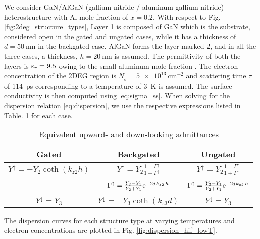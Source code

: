 We consider GaN/AlGaN (gallium nitride / aluminum gallium nitride)  heterostructure with Al mole-fraction of $x = \num[round-precision=1]{0.2}$. With respect to Fig. \ref{fig:2deg_structure_types}, Layer 1 is composed of GaN which is the substrate, considered open in the gated and ungated cases, while it has a thickness of $d = \SI{50}{\nm}$ in the backgated case. AlGaN forms the layer marked 2, and in all the three cases, a thickness, $h = \SI{20}{\nm}$ is assumed. The permittivity of both the layers is $\varepsilon_r = 9.5$ owing to the small aluminum mole fraction \cite{Muravjov2010}. The electron concentration of the 2DEG region is $N_s = \SI{5e13}{\cm^{-2}}$ and scattering time $\tau$ of \SI{114}{\ps} corresponding to a temperature of \SI{3}{\kelvin} is assumed. The surface conductivity is then computed using \eqref{eq:sigma_ss}. When solving for the dispersion relation \eqref{eq:dispersion}, we use the respective expressions listed in Table. \ref{tab:equations} for each case.
%
\begin{table}[!htbp]
\begin{center}
 \begin{tabular}{|c |c |c|}
 \hline
 Gated & Backgated  & Ungated \\ [0.5ex]
 \hline\hline
 $Y^{\uparrow} = - Y_{2} \coth (k_{z2} h)$ & $Y^{\uparrow} = Y_{2} \frac{1 - \Gamma^{\uparrow}}{1 + \Gamma^{\uparrow}}$ & $Y^{\uparrow} = Y_{2} \frac{1 - \Gamma^{\uparrow}}{1 + \Gamma^{\uparrow}}$ \\  & & \\ [2ex]
\num{} & $\Gamma^{\uparrow} = \frac{Y_2 - Y_1}{Y_2 + Y_1} \mathrm{e}^{-2{j}\mkern1mu k_{z2}\, h}$ & $\Gamma^{\uparrow} = \frac{Y_2 - Y_1}{Y_2 + Y_1} \mathrm{e}^{-2{j}\mkern1mu k_{z2}\, h}$ \\  & &  \\ [2ex]
 $Y^{\downarrow} = Y_{3}$ & $Y^{\downarrow} = - Y_{3} \coth (k_{z3} d)$ &  $Y^{\downarrow} = Y_{3}$ \\
 \hline
 \end{tabular}
  \end{center}
 \caption{Equivalent upward- and down-looking admittances}
 \label{tab:equations}
\end{table}
%

The dispersion curves for each structure type at varying temperatures and electron concentrations are plotted in Fig. \ref{fig:dispersion_hif_lowT}.
%
\begin{sidewaysfigure}
  \centering
  \caption{Dispersion Curves plotted for a GaN/AlGaN heterostructure with $N_s = \SI{5e13}{\cm^{-2}}$ at \SI{3}{\kelvin} (a) Gated (b) Backgated (c) Ungated}
  \label{fig:dispersion_hif_lowT}
\end{sidewaysfigure}
%

